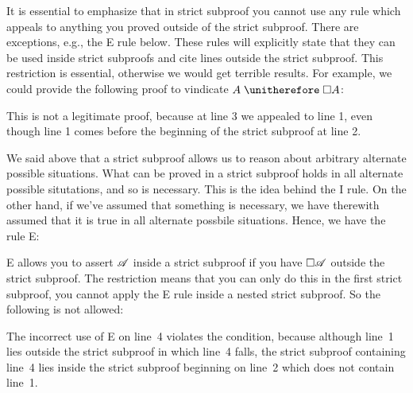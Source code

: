 It is essential to emphasize that in strict subproof you cannot use any rule which appeals to anything you proved outside of the strict subproof. There are exceptions, e.g., the \ebox E rule below. These rules will explicitly state that they can be used inside strict subproofs and cite lines outside the strict subproof. This restriction is essential, otherwise we would get terrible results. For example, we could provide the following proof to vindicate $A\therefore \ebox A$:
\begin{fitchproof}
		\PR
		\open
		\AS
		\close
\end{fitchproof}
This is not a legitimate proof, because at line 3 we appealed to line 1, even though line 1 comes before the beginning of the strict subproof at line 2.

We said above that a strict subproof allows us to reason about arbitrary alternate possible situations. What can be proved in a strict subproof holds in all alternate possible situtations, and so is necessary. This is the idea behind the \ebox I rule. On the other hand, if we've assumed that something is necessary, we have therewith assumed that it is true in all alternate possbile situations.  Hence, we have the rule \ebox E:

\ebox E allows you to assert $\mathscr{A}$ inside a strict subproof if you have $\Box \mathscr{A}$ outside the strict subproof. The restriction means that you can only do this in the first strict subproof, you cannot apply the \ebox E rule inside a nested strict subproof. So the following is not allowed:
\begin{fitchproof}
	\open
	\AS
	\open
	\AS
\close\close
\end{fitchproof}
The incorrect use of \ebox E on line~4 violates the condition, because although line~1 lies outside the strict subproof in which line~4 falls, the strict subproof containing line~4 lies inside the strict subproof beginning on line~2 which does not contain line~1.

